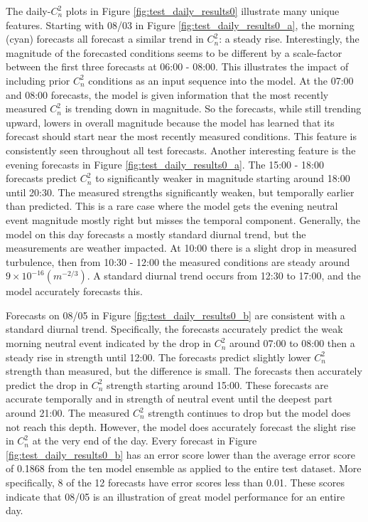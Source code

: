 The daily-$C_{n}^{2}$ plots in Figure \ref{fig:test_daily_results0} illustrate many unique features. Starting with 08/03 in Figure \ref{fig:test_daily_results0_a}, the morning (cyan) forecasts all forecast a similar trend in $C_{n}^{2}$: a steady rise. Interestingly, the magnitude of the forecasted conditions seems to be different by a scale-factor between the first three forecasts at 06:00 - 08:00. This illustrates the impact of including prior $C_{n}^{2}$ conditions as an input sequence into the model. At the 07:00 and 08:00 forecasts, the model is given information that the most recently measured $C_{n}^{2}$ is trending down in magnitude. So the forecasts, while still trending upward, lowers in overall magnitude because the model has learned that its forecast should start near the most recently measured conditions. This feature is consistently seen throughout all test forecasts. Another interesting feature is the evening forecasts in Figure \ref{fig:test_daily_results0_a}. The 15:00 - 18:00 forecasts predict $C_{n}^{2}$ to significantly weaker in magnitude starting around 18:00 until 20:30. The measured strengths significantly weaken, but temporally earlier than predicted. This is a rare case where the model gets the evening neutral event magnitude mostly right but misses the temporal component. Generally, the model on this day forecasts a mostly standard diurnal trend, but the measurements are weather impacted. At 10:00 there is a slight drop in measured turbulence, then from 10:30 - 12:00 the measured conditions are steady around $9 \times 10^{-16} (m^{-2/3})$. A standard diurnal trend occurs from 12:30 to 17:00, and the model accurately forecasts this.

Forecasts on 08/05 in Figure \ref{fig:test_daily_results0_b} are consistent with a standard diurnal trend. Specifically, the forecasts accurately predict the weak morning neutral event indicated by the drop in $C_{n}^{2}$ around 07:00 to 08:00 then a steady rise in strength until 12:00. The forecasts predict slightly lower $C_{n}^{2}$ strength than measured, but the difference is small. The forecasts then accurately predict the drop in $C_{n}^{2}$ strength starting around 15:00. These forecasts are accurate temporally and in strength of neutral event until the deepest part around 21:00. The measured $C_{n}^{2}$ strength continues to drop but the model does not reach this depth. However, the model does accurately forecast the slight rise in $C_{n}^{2}$ at the very end of the day. Every forecast in Figure \ref{fig:test_daily_results0_b} has an error score lower than the average error score of 0.1868 from the ten model ensemble as applied to the entire test dataset. More specifically, 8 of the 12 forecasts have error scores less than 0.01. These scores indicate that 08/05 is an illustration of great model performance for an entire day.

